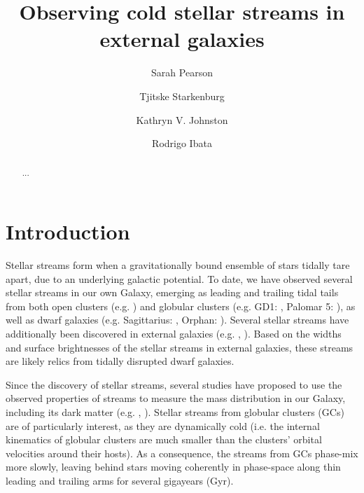 \documentclass[twocolumn]{aastex62}
\begin{document}
\sloppy\sloppypar\raggedbottom\frenchspacing %
\title{Observing cold stellar streams in external galaxies}


 \author{Sarah Pearson}

\author{Tjitske Starkenburg}

\author{Kathryn V. Johnston}

\author{Rodrigo Ibata}

\begin{abstract}\noindent %
    ...
\end{abstract}

\section{Introduction} \label{sec:intro}
Stellar streams form when a gravitationally bound ensemble of stars tidally tare apart, due to an underlying galactic potential. To date, we have observed several stellar streams in our own Galaxy, emerging as leading and trailing tidal tails from both open clusters (e.g. \citealt{roser19}) and globular clusters (e.g. GD1: \citealt{grillmair06}, Palomar 5: \citealt{oden01}), as well as dwarf galaxies (e.g. Sagittarius: \citealt{ibata01}, Orphan: \citealt{belokurov06}). Several stellar streams have additionally been discovered in external galaxies (e.g. \citealt{ibata00}, \citealt{delgado10}). Based on the widths and surface brightnesses of the stellar streams in external galaxies, these streams are likely relics from tidally disrupted dwarf galaxies.

Since the discovery of stellar streams, several studies have proposed to use the observed properties of streams to measure the mass distribution in our Galaxy, including its dark matter (e.g. \citealt{johnston98}, \citealt{johnston01}). Stellar streams from globular clusters (GCs) are of particularly interest, as they are dynamically cold (i.e. the internal kinematics of globular clusters are much smaller than the clusters' orbital velocities around their hosts). As a consequence, the streams from GCs phase-mix more slowly, leaving behind stars moving coherently in phase-space along thin leading and trailing arms for several gigayears (Gyr). %
\end{document}
